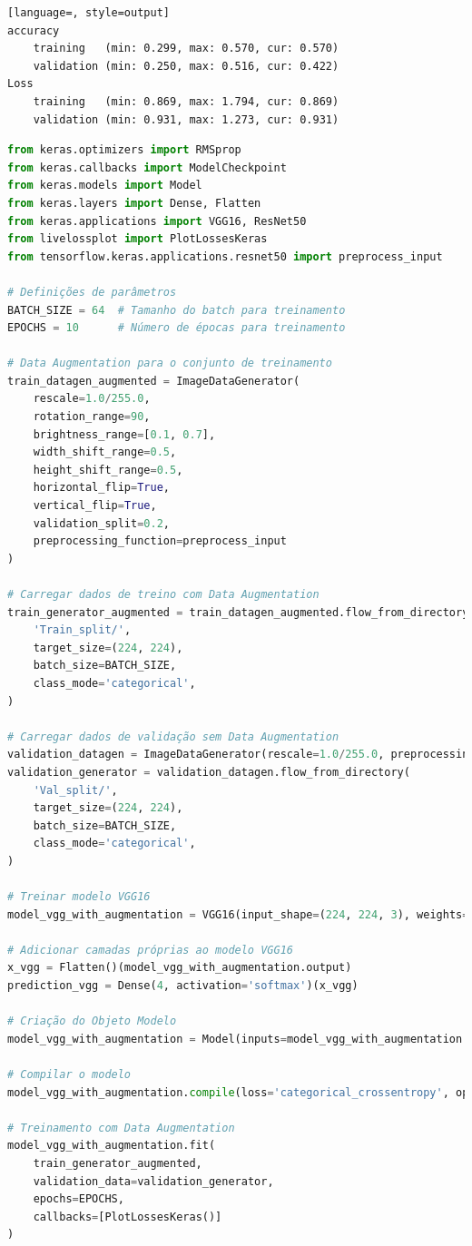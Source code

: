 \begin{lstlisting}[language=, style=output]
accuracy
	training   (min: 0.299, max: 0.570, cur: 0.570)
	validation (min: 0.250, max: 0.516, cur: 0.422)
Loss
	training   (min: 0.869, max: 1.794, cur: 0.869)
	validation (min: 0.931, max: 1.273, cur: 0.931)
\end{lstlisting}


\begin{lstlisting}[language=Python, style=input]
from keras.optimizers import RMSprop
from keras.callbacks import ModelCheckpoint
from keras.models import Model
from keras.layers import Dense, Flatten
from keras.applications import VGG16, ResNet50
from livelossplot import PlotLossesKeras
from tensorflow.keras.applications.resnet50 import preprocess_input

# Definições de parâmetros
BATCH_SIZE = 64  # Tamanho do batch para treinamento
EPOCHS = 10      # Número de épocas para treinamento

# Data Augmentation para o conjunto de treinamento
train_datagen_augmented = ImageDataGenerator(
    rescale=1.0/255.0,
    rotation_range=90,
    brightness_range=[0.1, 0.7],
    width_shift_range=0.5,
    height_shift_range=0.5,
    horizontal_flip=True,
    vertical_flip=True,
    validation_split=0.2,
    preprocessing_function=preprocess_input
)

# Carregar dados de treino com Data Augmentation
train_generator_augmented = train_datagen_augmented.flow_from_directory(
    'Train_split/',
    target_size=(224, 224),
    batch_size=BATCH_SIZE,
    class_mode='categorical',
)

# Carregar dados de validação sem Data Augmentation
validation_datagen = ImageDataGenerator(rescale=1.0/255.0, preprocessing_function=preprocess_input)
validation_generator = validation_datagen.flow_from_directory(
    'Val_split/',
    target_size=(224, 224),
    batch_size=BATCH_SIZE,
    class_mode='categorical',
)

# Treinar modelo VGG16
model_vgg_with_augmentation = VGG16(input_shape=(224, 224, 3), weights='imagenet', include_top=False)  # Use o modelo pré-treinado

# Adicionar camadas próprias ao modelo VGG16
x_vgg = Flatten()(model_vgg_with_augmentation.output)
prediction_vgg = Dense(4, activation='softmax')(x_vgg)

# Criação do Objeto Modelo
model_vgg_with_augmentation = Model(inputs=model_vgg_with_augmentation.input, outputs=prediction_vgg)

# Compilar o modelo
model_vgg_with_augmentation.compile(loss='categorical_crossentropy', optimizer=RMSprop(learning_rate=0.0001), metrics=['accuracy'])

# Treinamento com Data Augmentation
model_vgg_with_augmentation.fit(
    train_generator_augmented,
    validation_data=validation_generator,
    epochs=EPOCHS,
    callbacks=[PlotLossesKeras()]
)
\end{lstlisting}
